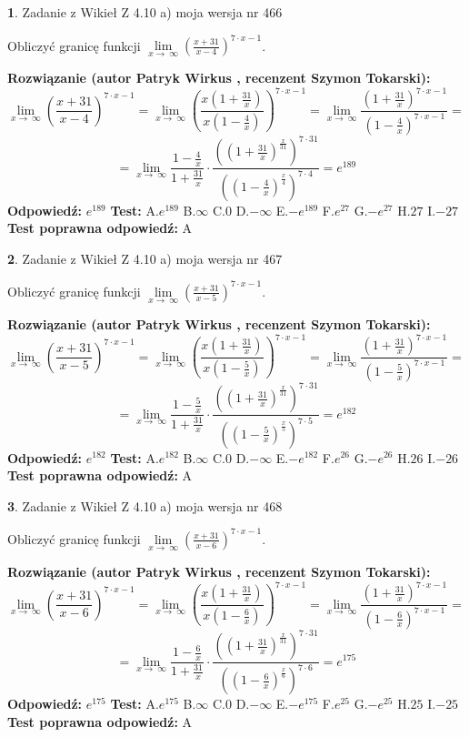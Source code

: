 \documentclass[12pt, a4paper]{article}
\theoremstyle{definition} %
\newtheorem{zad}{}
\newcommand{\zadStart}[1]{\begin{zad}#1\newline}
\newcommand{\zadStop}{\end{zad}}
\newcommand{\rozwStart}[2]{\noindent \textbf{Rozwiązanie (autor #1 , recenzent #2): }\newline}
\newcommand{\rozwStop}{\newline}
\newcommand{\odpStart}{\noindent \textbf{Odpowiedź:}\newline}
\newcommand{\odpStop}{\newline}
\newcommand{\testStart}{\noindent \textbf{Test:}\newline}
\newcommand{\testStop}{\newline}
\newcommand{\kluczStart}{\noindent \textbf{Test poprawna odpowiedź:}\newline}
\newcommand{\kluczStop}{\newline}
\begin{document}
\zadStart{Zadanie z Wikieł Z 4.10 a) moja wersja nr 466}

Obliczyć granicę funkcji  $\lim\limits_{x\to\ \infty}(\frac{x+31}{x-4})^{7\cdot x-1}$.
\zadStop
\rozwStart{Patryk Wirkus}{Szymon Tokarski}
$$\lim\limits_{x\to\ \infty}(\frac{x+31}{x-4})^{7\cdot x-1} = \lim\limits_{x\to\ \infty}(\frac{x(1+\frac{31}{x})}{x(1-\frac{4}{x})})^{7\cdot x-1}=\lim\limits_{x\to\ \infty}\frac{(1+\frac{31}{x})^{7\cdot x-1}}{(1-\frac{4}{x})^{7\cdot x-1}}=$$
$$=\lim\limits_{x\to\ \infty}\frac{1-\frac{4}{x}}{1+\frac{31}{x}}\cdot\frac{((1+\frac{31}{x})^{\frac{x}{31}})^{7\cdot31}}{((1-\frac{4}{x})^{\frac{x}{4}})^{7\cdot4}}=e^{189}$$
\rozwStop
\odpStart
$e^{189}$
\odpStop
\testStart
A.$e^{189}$ B.$\infty$ C.$0$ D.$-\infty$ E.$-e^{189}$
F.$e^{27}$ G.$-e^{27}$
H.$27$
I.$-27$
\testStop
\kluczStart
A
\kluczStop



\zadStart{Zadanie z Wikieł Z 4.10 a) moja wersja nr 467}

Obliczyć granicę funkcji  $\lim\limits_{x\to\ \infty}(\frac{x+31}{x-5})^{7\cdot x-1}$.
\zadStop
\rozwStart{Patryk Wirkus}{Szymon Tokarski}
$$\lim\limits_{x\to\ \infty}(\frac{x+31}{x-5})^{7\cdot x-1} = \lim\limits_{x\to\ \infty}(\frac{x(1+\frac{31}{x})}{x(1-\frac{5}{x})})^{7\cdot x-1}=\lim\limits_{x\to\ \infty}\frac{(1+\frac{31}{x})^{7\cdot x-1}}{(1-\frac{5}{x})^{7\cdot x-1}}=$$
$$=\lim\limits_{x\to\ \infty}\frac{1-\frac{5}{x}}{1+\frac{31}{x}}\cdot\frac{((1+\frac{31}{x})^{\frac{x}{31}})^{7\cdot31}}{((1-\frac{5}{x})^{\frac{x}{5}})^{7\cdot5}}=e^{182}$$
\rozwStop
\odpStart
$e^{182}$
\odpStop
\testStart
A.$e^{182}$ B.$\infty$ C.$0$ D.$-\infty$ E.$-e^{182}$
F.$e^{26}$ G.$-e^{26}$
H.$26$
I.$-26$
\testStop
\kluczStart
A
\kluczStop



\zadStart{Zadanie z Wikieł Z 4.10 a) moja wersja nr 468}

Obliczyć granicę funkcji  $\lim\limits_{x\to\ \infty}(\frac{x+31}{x-6})^{7\cdot x-1}$.
\zadStop
\rozwStart{Patryk Wirkus}{Szymon Tokarski}
$$\lim\limits_{x\to\ \infty}(\frac{x+31}{x-6})^{7\cdot x-1} = \lim\limits_{x\to\ \infty}(\frac{x(1+\frac{31}{x})}{x(1-\frac{6}{x})})^{7\cdot x-1}=\lim\limits_{x\to\ \infty}\frac{(1+\frac{31}{x})^{7\cdot x-1}}{(1-\frac{6}{x})^{7\cdot x-1}}=$$
$$=\lim\limits_{x\to\ \infty}\frac{1-\frac{6}{x}}{1+\frac{31}{x}}\cdot\frac{((1+\frac{31}{x})^{\frac{x}{31}})^{7\cdot31}}{((1-\frac{6}{x})^{\frac{x}{6}})^{7\cdot6}}=e^{175}$$
\rozwStop
\odpStart
$e^{175}$
\odpStop
\testStart
A.$e^{175}$ B.$\infty$ C.$0$ D.$-\infty$ E.$-e^{175}$
F.$e^{25}$ G.$-e^{25}$
H.$25$
I.$-25$
\testStop
\kluczStart
A
\kluczStop
\end{document}
